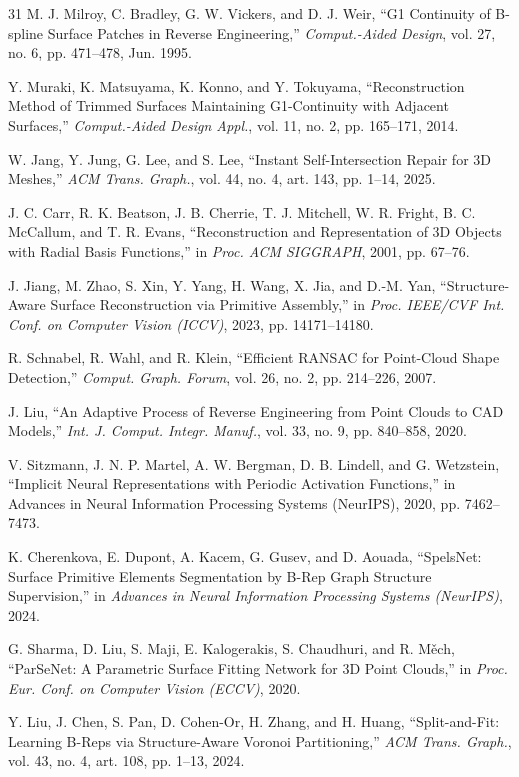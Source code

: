 \documentclass{ieeeaccess}
\begin{document}
\begin{thebibliography}{31}
M. J. Milroy, C. Bradley, G. W. Vickers, and D. J. Weir,
``G1 Continuity of B-spline Surface Patches in Reverse Engineering,''
\emph{Comput.-Aided Design}, vol. 27, no. 6, pp. 471--478, Jun. 1995.

Y. Muraki, K. Matsuyama, K. Konno, and Y. Tokuyama,
``Reconstruction Method of Trimmed Surfaces Maintaining G1-Continuity with Adjacent Surfaces,''
\emph{Comput.-Aided Design Appl.}, vol. 11, no. 2, pp. 165--171, 2014.

W. Jang, Y. Jung, G. Lee, and S. Lee,
``Instant Self-Intersection Repair for 3D Meshes,''
\emph{ACM Trans. Graph.}, vol. 44, no. 4, art. 143, pp. 1--14, 2025.

J. C. Carr, R. K. Beatson, J. B. Cherrie, T. J. Mitchell, W. R. Fright, B. C. McCallum, and T. R. Evans,
``Reconstruction and Representation of 3D Objects with Radial Basis Functions,''
in \emph{Proc. ACM SIGGRAPH}, 2001, pp. 67--76.

J. Jiang, M. Zhao, S. Xin, Y. Yang, H. Wang, X. Jia, and D.-M. Yan,
``Structure-Aware Surface Reconstruction via Primitive Assembly,''
in \emph{Proc. IEEE/CVF Int. Conf. on Computer Vision (ICCV)}, 2023, pp. 14171--14180.

R. Schnabel, R. Wahl, and R. Klein,
``Efficient RANSAC for Point-Cloud Shape Detection,''
\emph{Comput. Graph. Forum}, vol. 26, no. 2, pp. 214--226, 2007.

J. Liu,
``An Adaptive Process of Reverse Engineering from Point Clouds to CAD Models,''
\emph{Int. J. Comput. Integr. Manuf.}, vol. 33, no. 9, pp. 840--858, 2020.

V. Sitzmann, J. N. P. Martel, A. W. Bergman, D. B. Lindell, and G. Wetzstein,
``Implicit Neural Representations with Periodic Activation Functions,''
in Advances in Neural Information Processing Systems (NeurIPS), 2020, pp. 7462--7473.

K. Cherenkova, E. Dupont, A. Kacem, G. Gusev, and D. Aouada,
``SpelsNet: Surface Primitive Elements Segmentation by B-Rep Graph Structure Supervision,''
in \emph{Advances in Neural Information Processing Systems (NeurIPS)}, 2024.

G. Sharma, D. Liu, S. Maji, E. Kalogerakis, S. Chaudhuri, and R. M\v{e}ch,
``ParSeNet: A Parametric Surface Fitting Network for 3D Point Clouds,''
in \emph{Proc. Eur. Conf. on Computer Vision (ECCV)}, 2020.

Y. Liu, J. Chen, S. Pan, D. Cohen-Or, H. Zhang, and H. Huang,
``Split-and-Fit: Learning B-Reps via Structure-Aware Voronoi Partitioning,''
\emph{ACM Trans. Graph.}, vol. 43, no. 4, art. 108, pp. 1--13, 2024.


\end{thebibliography}
\end{document}
